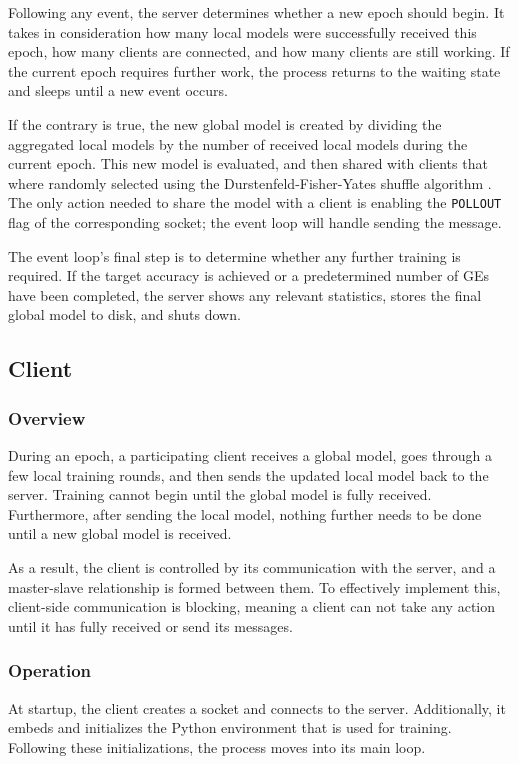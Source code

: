 Following any event, the server determines whether a new epoch should begin. It takes in consideration how many local models were successfully received this epoch, how many clients are connected, and how many clients are still working. If the current epoch requires further work, the process returns to the waiting state and sleeps until a new event occurs.

If the contrary is true, the new global model is created by dividing the aggregated local models by the number of received local models during the current epoch. This new model is evaluated, and then shared with clients that where randomly selected using the Durstenfeld-Fisher-Yates shuffle algorithm \cite{Durstenfeld_Fisher_Yates_paper, Fisher_Yates_shuffle_wiki}. The only action needed to share the model with a client is enabling the \texttt{POLLOUT} flag of the corresponding socket; the event loop will handle sending the message.

The event loop's final step is to determine whether any further training is required. If the target accuracy is achieved or a predetermined number of GEs have been completed, the server shows any relevant statistics, stores the final global model to disk, and shuts down.

\subsection{Client}
\subsubsection{Overview}
During an epoch, a participating client receives a global model, goes through a few local training rounds, and then sends the updated local model back to the server. Training cannot begin until the global model is fully received. Furthermore, after sending the local model, nothing further needs to be done until a new global model is received.

As a result, the client is controlled by its communication with the server, and a master-slave relationship is formed between them. To effectively implement this, client-side communication is blocking, meaning a client can not take any action until it has fully received or send its messages.

\subsubsection{Operation}
At startup, the client creates a socket and connects to the server. Additionally, it embeds and initializes the Python environment that is used for training.  Following these initializations, the process moves into its main loop.

